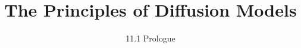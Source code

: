 
\title{The Principles of Diffusion Models}
\subtitle{11.1 Prologue}


\begin{frame}
    \titlepage
\end{frame}


